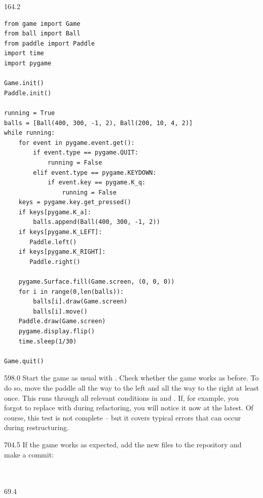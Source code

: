 \documentclass{aslab}
\begin{document}
\begin{region}{164.2}
\begin{lstlisting}[style=pyn]
from game import Game
from ball import Ball
from paddle import Paddle
import time
import pygame

Game.init()
Paddle.init()

running = True
balls = [Ball(400, 300, -1, 2), Ball(200, 10, 4, 2)]
while running:
    for event in pygame.event.get():
        if event.type == pygame.QUIT:
            running = False
        elif event.type == pygame.KEYDOWN:
            if event.key == pygame.K_q:
                running = False
    keys = pygame.key.get_pressed()
    if keys[pygame.K_a]:
        balls.append(Ball(400, 300, -1, 2))
    if keys[pygame.K_LEFT]:
       Paddle.left()
    if keys[pygame.K_RIGHT]:
       Paddle.right()

    pygame.Surface.fill(Game.screen, (0, 0, 0))
    for i in range(0,len(balls)):
        balls[i].draw(Game.screen)
        balls[i].move()
    Paddle.draw(Game.screen)
    pygame.display.flip()
    time.sleep(1/30)

Game.quit()
\end{lstlisting}
\end{region}

\begin{region}[pitch=13.37]{598.0}
Start the game as usual with . Check whether the game
works as before. To do so, move the paddle all the way to the left and all the
way to the right at least once. This runs through all relevant conditions in
 and . If, for example, you forgot to
replace  with  during refactoring, you will
notice it now at the latest. Of course, this test is not complete -- but it
covers typical errors that can occur during restructuring.
\end{region}

\begin{region}[pitch=13.2]{704.5}
If the game works as expected, add the new files to the repository and make a
commit:\\
\\
\\
\end{region}

\nextpage
\begin{region}{69.4}
\end{region}
\end{document}
